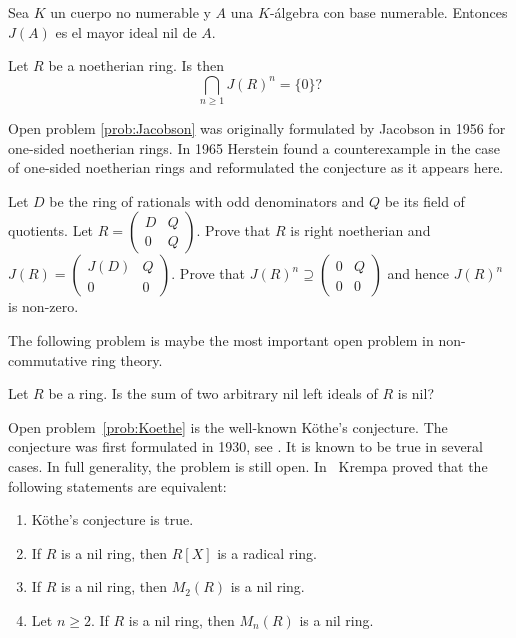 \begin{corollary}
	Sea $K$ un cuerpo no numerable y $A$ una $K$-álgebra con base numerable.
	Entonces $J(A)$ es el mayor ideal nil de $A$.
\end{corollary}


\begin{openproblem}
\label{prob:Jacobson}
Let $R$ be a noetherian ring. Is then 
\[
\bigcap_{n\geq1}J(R)^n=\{0\}?
\]
\end{openproblem}

Open problem \ref{prob:Jacobson} was originally formulated by Jacobson in 1956 \cite{MR0222106} 
for one-sided noetherian rings. In 1965 Herstein \cite{MR188253} found a counterexample
in the case of one-sided noetherian rings 
and reformulated the conjecture as it appears here. 

\begin{exercise}[Herstein]
Let $D$ be the ring of rationals with odd denominators and $Q$ be its field of quotients. Let
$R=\begin{pmatrix}
    D & Q\\
    0 & Q
\end{pmatrix}$. Prove that $R$ is right noetherian and 
$J(R)=\begin{pmatrix}
J(D) & Q\\
0 & 0
\end{pmatrix}$. Prove that 
$J(R)^n\supseteq\begin{pmatrix}0&Q\\0&0\end{pmatrix}$ and hence $J(R)^n$ is non-zero. 
\end{exercise}

The following problem is maybe the most important open 
problem in non-commutative ring theory. 

\begin{openproblem}[K\"othe]
\label{prob:Koethe}
Let $R$ be a ring. Is the sum 
of two arbitrary nil left ideals of $R$ is nil?
\end{openproblem}

Open problem~\ref{prob:Koethe} is the well-known K\"othe's conjecture. 
The conjecture was first formulated in 1930, see \cite{MR1545158}. It is known to be true
in several cases. In full generality, the problem is still open. In~\cite{MR306251} 
Krempa proved that
the following statements are equivalent:
\begin{enumerate}
    \item K\"othe's conjecture is true.  
    \item If $R$ is a nil ring, then $R[X]$ is a radical ring. 
    \item If $R$ is a nil ring, then $M_2(R)$ is a nil ring. 
    \item Let $n\geq2$. If $R$ is a nil ring, then $M_n(R)$ is a nil ring. 
\end{enumerate}

